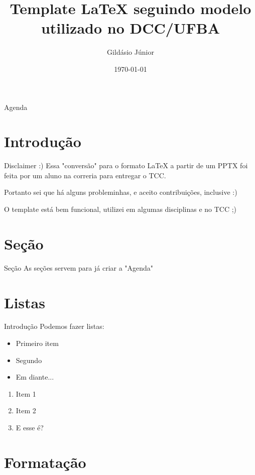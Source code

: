 \documentclass[aspectratio=169,xcolor=table]{beamer}
\author{Gildásio Júnior}
\title{Template LaTeX seguindo modelo utilizado no DCC/UFBA}
\institute{Universidade Federal da Bahia}
\date{\today}
\begin{document}
\begin{frame}
    \titlepage
\end{frame}

\begin{frame}{Agenda}
	\tableofcontents
\end{frame}

\section{Introdução}

\begin{frame}{Disclaimer :)}
    Essa "conversão" para o formato LaTeX \cite{mittelbach2004latex} a partir de
    um PPTX foi feita por um aluno na correria para entregar o TCC.

    Portanto sei que há alguns probleminhas, e aceito contribuições, inclusive :)

    O template está bem funcional, utilizei em algumas disciplinas e no TCC ;)
\end{frame}

\section{Seção}

\begin{frame}{Seção}
    As seções servem para já criar a "Agenda"
\end{frame}

\section{Listas}

\begin{frame}{Introdução}
    Podemos fazer listas:
	\begin{itemize}
		\item Primeiro item
		\item Segundo
        \item Em diante...
	\end{itemize}
	\begin{enumerate}
		\item Item 1
        \item Item 2
		\item E esse é?
	\end{enumerate}
\end{frame}

\section{Formatação}
\end{document}
